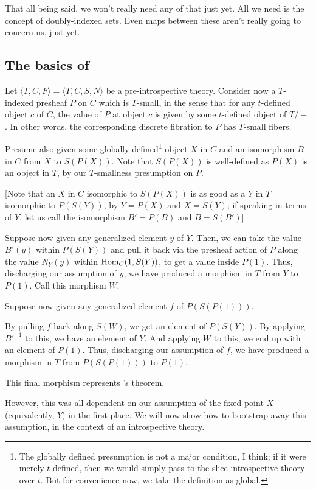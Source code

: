 That all being said, we won't really need any of that just yet. All we need is the concept of doubly-indexed sets. Even maps between these aren't really going to concern us, just yet.

\subsection{The basics of \Loeb}
Let $\langle T, C, F \rangle = \langle T, C, S, N \rangle$ be a pre-introspective theory. Consider now a $T$-indexed presheaf $P$ on $C$ which is $T$-small, in the sense that for any $t$-defined object $c$ of $C$, the value of $P$ at object $c$ is given by some $t$-defined object of $T/-$. In other words, the corresponding discrete fibration to $P$ has $T$-small fibers.

Presume also given some globally defined\footnote{The globally defined presumption is not a major condition, I think; if it were merely $t$-defined, then we would simply pass to the slice introspective theory over $t$. But for convenience now, we take the definition as global. } object $X$ in $C$ and an isomorphism $B$ in $C$ from $X$ to $S(P(X))$. Note that $S(P(X))$ is well-defined as $P(X)$ is an object in $T$, by our $T$-smallness presumption on $P$.

[Note that an $X$ in $C$ isomorphic to $S(P(X))$ is as good as a $Y$ in $T$ isomorphic to $P(S(Y))$, by $Y = P(X)$ and $X = S(Y)$; if speaking in terms of $Y$, let us call the isomorphism $B' = P(B)$ and $B = S(B')$]

Suppose now given any generalized element $y$ of $Y$. Then, we can take the value $B'(y)$ within $P(S(Y))$ and pull it back via the presheaf action of $P$ along the value $N_Y(y)$ within $\operatorname{Hom}_C(1, S(Y))$, to get a value inside $P(1)$. Thus, discharging our assumption of $y$, we have produced a morphism in $T$ from $Y$ to $P(1)$. Call this morphism $W$.

Suppose now given any generalized element $f$ of $P(S(P(1)))$.

By pulling $f$ back along $S(W)$, we get an element of $P(S(Y))$. By applying $B'^{-1}$ to this, we have an element of $Y$. And applying $W$ to this, we end up with an element of $P(1)$. Thus, discharging our assumption of $f$, we have produced a morphism in $T$ from $P(S(P(1)))$ to $P(1)$.

This final morphism represents \Loeb's theorem. 

However, this was all dependent on our assumption of the fixed point $X$ (equivalently, $Y$) in the first place. We will now show how to bootstrap away this assumption, in the context of an introspective theory.